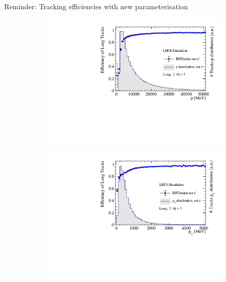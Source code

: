 \documentclass[xcolor={dvipsnames}]{beamer}
\begin{document}
\begin{frame}{Reminder: Tracking efficiencies with new parameterisation}
  \vspace{0.0cm}
  \begin{figure}[htb]
    \centering
    \begin{subfigure}{0.45\textwidth}
      \includegraphics[width=1\textwidth]{Plots/TrackEfficiency_p_bad_MC_parameterisation.pdf}
    \end{subfigure}%
    \begin{subfigure}{0.45\textwidth}
      \includegraphics[width=1\textwidth]{Plots/TrackEfficiency_pt_bad_MC_parameterisation.pdf}
    \end{subfigure}
    \begin{subfigure}{0.45\textwidth}

\end{subfigure}
\end{figure}
\end{frame}
\end{document}
